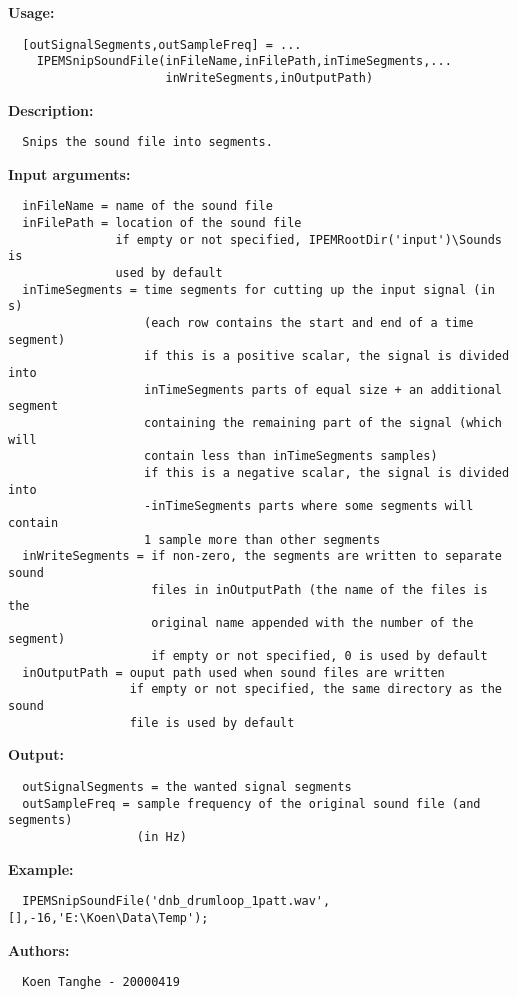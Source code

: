 \textbf{Usage:}
\begin{verbatim}  [outSignalSegments,outSampleFreq] = ...
    IPEMSnipSoundFile(inFileName,inFilePath,inTimeSegments,...
                      inWriteSegments,inOutputPath)

\end{verbatim}
\textbf{Description:}
\begin{verbatim}  Snips the sound file into segments.

\end{verbatim}
\textbf{Input arguments:}
\begin{verbatim}  inFileName = name of the sound file
  inFilePath = location of the sound file
               if empty or not specified, IPEMRootDir('input')\Sounds is
               used by default
  inTimeSegments = time segments for cutting up the input signal (in s)
                   (each row contains the start and end of a time segment)
                   if this is a positive scalar, the signal is divided into
                   inTimeSegments parts of equal size + an additional segment
                   containing the remaining part of the signal (which will
                   contain less than inTimeSegments samples)
                   if this is a negative scalar, the signal is divided into
                   -inTimeSegments parts where some segments will contain
                   1 sample more than other segments
  inWriteSegments = if non-zero, the segments are written to separate sound
                    files in inOutputPath (the name of the files is the
                    original name appended with the number of the segment)
                    if empty or not specified, 0 is used by default
  inOutputPath = ouput path used when sound files are written
                 if empty or not specified, the same directory as the sound
                 file is used by default

\end{verbatim}
\textbf{Output:}
\begin{verbatim}  outSignalSegments = the wanted signal segments
  outSampleFreq = sample frequency of the original sound file (and segments)
                  (in Hz)

\end{verbatim}
\textbf{Example:}
\begin{verbatim}  IPEMSnipSoundFile('dnb_drumloop_1patt.wav',[],-16,'E:\Koen\Data\Temp');

\end{verbatim}
\textbf{Authors:}
\begin{verbatim}  Koen Tanghe - 20000419
\end{verbatim}



